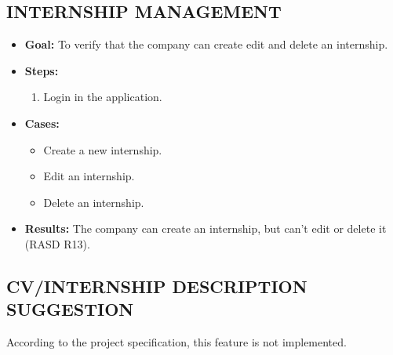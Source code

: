 \subsection{INTERNSHIP MANAGEMENT}\label{subsec:internship-management}
\begin{itemize}
    \item \textbf{Goal:} To verify that the company can create edit and delete an internship.

    \item \textbf{Steps:}
    \begin{enumerate}
        \item Login in the application.

    \end{enumerate}
    \item \textbf{Cases:}
    \begin{itemize}
        \item Create a new internship.
        \item Edit an internship.
        \item Delete an internship.
    \end{itemize}
    \item \textbf{Results:} The company can create an internship, but can't edit or delete it (RASD R13).

\end{itemize}

\subsection{CV/INTERNSHIP DESCRIPTION SUGGESTION}\label{subsec:cv-internship-description-suggestion}
According to the project specification, this feature is not implemented.


